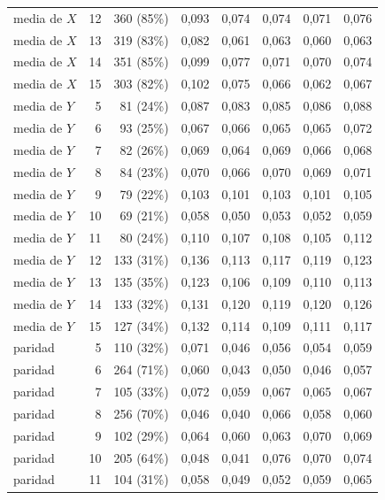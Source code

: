 \begin{table}[htbp]
{\begin{tabular}{@{}lrrrrrrr@{}}
        media de $X$ & 12 & 360 (85\%) & 0,093 & 0,074 & 0,074 & 0,071 & 0,076 \\
        media de $X$ & 13 & 319 (83\%) & 0,082 & 0,061 & 0,063 & 0,060 & 0,063 \\
        media de $X$ & 14 & 351 (85\%) & 0,099 & 0,077 & 0,071 & 0,070 & 0,074 \\
        media de $X$ & 15 & 303 (82\%) & 0,102 & 0,075 & 0,066 & 0,062 & 0,067 \\
        media de $Y$ & 5 & 81 (24\%) & 0,087 & 0,083 & 0,085 & 0,086 & 0,088 \\
        media de $Y$ & 6 & 93 (25\%) & 0,067 & 0,066 & 0,065 & 0,065 & 0,072 \\
        media de $Y$ & 7 & 82 (26\%) & 0,069 & 0,064 & 0,069 & 0,066 & 0,068 \\
        media de $Y$ & 8 & 84 (23\%) & 0,070 & 0,066 & 0,070 & 0,069 & 0,071 \\
        media de $Y$ & 9 & 79 (22\%) & 0,103 & 0,101 & 0,103 & 0,101 & 0,105 \\
        media de $Y$ & 10 & 69 (21\%) & 0,058 & 0,050 & 0,053 & 0,052 & 0,059 \\
        media de $Y$ & 11 & 80 (24\%) & 0,110 & 0,107 & 0,108 & 0,105 & 0,112 \\
        media de $Y$ & 12 & 133 (31\%) & 0,136 & 0,113 & 0,117 & 0,119 & 0,123 \\
        media de $Y$ & 13 & 135 (35\%) & 0,123 & 0,106 & 0,109 & 0,110 & 0,113 \\
        media de $Y$ & 14 & 133 (32\%) & 0,131 & 0,120 & 0,119 & 0,120 & 0,126 \\
        media de $Y$ & 15 & 127 (34\%) & 0,132 & 0,114 & 0,109 & 0,111 & 0,117 \\
        paridad & 5 & 110 (32\%) & 0,071 & 0,046 & 0,056 & 0,054 & 0,059 \\
        paridad & 6 & 264 (71\%) & 0,060 & 0,043 & 0,050 & 0,046 & 0,057 \\
        paridad & 7 & 105 (33\%) & 0,072 & 0,059 & 0,067 & 0,065 & 0,067 \\
        paridad & 8 & 256 (70\%) & 0,046 & 0,040 & 0,066 & 0,058 & 0,060 \\
        paridad & 9 & 102 (29\%) & 0,064 & 0,060 & 0,063 & 0,070 & 0,069 \\
        paridad & 10 & 205 (64\%) & 0,048 & 0,041 & 0,076 & 0,070 & 0,074 \\
        paridad & 11 & 104 (31\%) & 0,058 & 0,049 & 0,052 & 0,059 & 0,065 \\

\end{tabular}}
\end{table}
